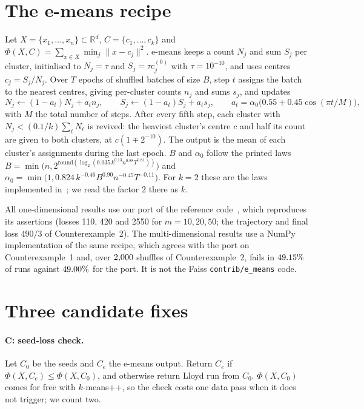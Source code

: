 \documentclass[11pt]{article}
\theoremstyle{remark}
\newcommand{\R}{\mathbb{R}}
\newcommand{\norm}[1]{\lVert #1\rVert}
\begin{document}
\section{The e-means recipe}\label{sec:recipe}

Let $X=\{x_1,\dots,x_n\}\subset\R^d$, $C=\{c_1,\dots,c_k\}$ and
$\Phi(X,C)=\sum_{x\in X}\min_j\norm{x-c_j}^2$. e-means keeps a count $N_j$ and sum $S_j$ per
cluster, initialised to $N_j=\tau$ and $S_j=\tau c_j^{(0)}$ with $\tau=10^{-10}$, and uses centres
$c_j=S_j/N_j$. Over $T$ epochs of shuffled batches of size $B$, step $t$ assigns the batch to the
nearest centres, giving per-cluster counts $n_j$ and sums $s_j$, and updates
\begin{equation}\label{eq:ema}
N_j\leftarrow(1-a_t)N_j+a_t n_j,\qquad S_j\leftarrow(1-a_t)S_j+a_t s_j,\qquad
a_t=\alpha_0\bigl(0.55+0.45\cos(\pi t/M)\bigr),
\end{equation}
with $M$ the total number of steps. After every fifth step, each cluster with
$N_j<(0.1/k)\sum_\ell N_\ell$ is revived: the heaviest cluster's centre $c$ and half its count
are given to both clusters, at $c(1\mp 2^{-10})$. The output is the mean of each cluster's
assignments during the last epoch. $B$ and $\alpha_0$ follow the printed laws
$B=\min\bigl(n,2^{\mathrm{round}(\log_2(0.035\,k^{0.13}n^{0.88}T^{0.81}))}\bigr)$ and
$\alpha_0=\min\bigl(1,0.824\,k^{-0.46}B^{0.90}n^{-0.45}T^{-0.11}\bigr)$. For $k=2$ these are the laws
implemented in~\cite{zh3nisrepo}; we read the factor $2$ there as $k$.

All one-dimensional results use our port of the reference code~\cite{zh3nisrepo}, which
reproduces its assertions (losses 110, 420 and 2550 for $m=10,20,50$; the trajectory and final
loss $490/3$ of Counterexample~2). The multi-dimensional results use a NumPy implementation of the
same recipe, which agrees with the port on Counterexample~1 and, over $2{,}000$ shuffles of
Counterexample~2, fails in $49.15\%$ of runs against $49.00\%$ for the port. It is not the Faiss \texttt{contrib/e\_means} code.

\section{Three candidate fixes}\label{sec:fixes}

\paragraph{C: seed-loss check.} Let $C_0$ be the seeds and $C_e$ the e-means output. Return $C_e$ if
$\Phi(X,C_e)\le\Phi(X,C_0)$, and otherwise return Lloyd run from $C_0$. $\Phi(X,C_0)$ comes for free
with $k$-means++, so the check costs one data pass when it does not trigger; we count two.
\end{document}
